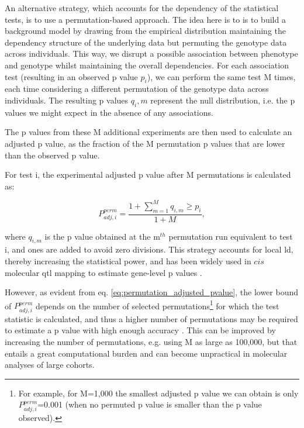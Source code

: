 An alternative strategy, which accounts for the dependency of the statistical tests, is to use a permutation-based approach. 
The idea here is to is to build a background model by drawing from the empirical distribution maintaining the dependency structure of the underlying data but permuting the genotype data across individuals.
This way, we disrupt a possible association between phenotype and genotype whilst maintaining the overall dependencies.
For each association test (resulting in an observed p value $p_i$), we can perform the same test M times, each time considering a different permutation of the genotype data across individuals. 
The resulting p values $q_i,m$ represent the null distribution, i.e. the p values we might expect in the absence of any associations.

The p values from these M additional experiments are then used to calculate an adjusted p value, as the fraction of the M permutation p values that are lower than the observed p value. 

For test i, the experimental adjusted p value after M permutations is calculated as:

\begin{equation}\label{eq:permutation_adjusted_pvalue}
    P_{adj,i}^{perm} = \frac{1+\sum_{m=1}^{M} q_{i,m} \geq p_i}{1+M},
\end{equation}

where $q_{i,m}$ is the p value obtained at the m$^{th}$ permutation run equivalent to test i, and ones are added to avoid zero divisions.  
This strategy accounts for local \gls{ld}, thereby increasing the statistical power, and has been widely used in $cis$ molecular \gls{qtl} mapping to estimate gene-level p values \cite{gtex2015genotype, sudmant2015integrated}.  


However, as evident from eq. \eqref{eq:permutation_adjusted_pvalue}, the lower bound of $P_{adj,i}^{perm}$ depends on the number of selected permutations\footnote{For example, for M=1,000 the smallest adjusted p value we can obtain is only $P_{adj,i}^{perm}$=0.001 (when no permuted p value is smaller than the p value observed).} for which the test statistic is calculated, and thus a higher number of permutations may be required to estimate a p value with high enough accuracy \cite{sul2015accurate}.
This can be improved by increasing the number of permutations, e.g. using M as large as 100,000, but that entails a great computational burden and can become unpractical in molecular analyses of large cohorts.\\

